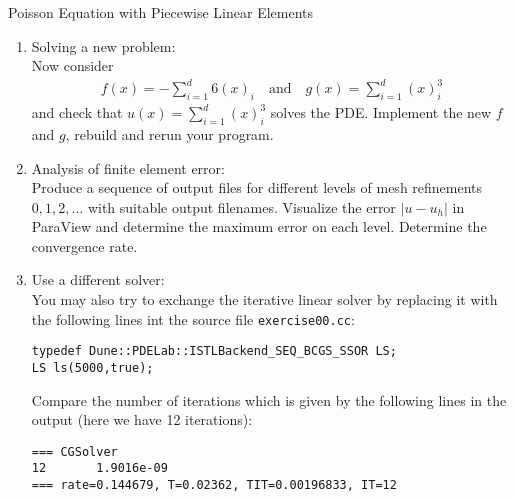\documentclass[12pt,a4paper]{article}
\begin{document}
\begin{Exercise}{Poisson Equation with Piecewise Linear Elements}
\begin{enumerate}
\item {\sc Solving a new problem}:\\
  Now consider
  \begin{align}
    f(x) =  -\sum_{i=1}^d 6(x)_i \quad\text{and}\quad  g(x) = \sum_{i=1}^d (x)_i^3
  \end{align}
  and check that $u(x)=\sum_{i=1}^d (x)_i^3$ solves the PDE. Implement
  the new $f$ and $g$, rebuild and rerun your program.

\item {\sc Analysis of finite element error}:\\
  Produce a sequence of output files for different levels of mesh
  refinements $0, 1, 2, \ldots$ with suitable output
  filenames. Visualize the error $|u-u_h|$ in Para\-View and determine
  the maximum error on each level.  Determine the convergence rate.

\item {\sc Use a different solver}:\\
  You may also try to exchange the iterative linear solver by
  replacing it with the following lines int the source file
  \lstinline{exercise00.cc}:
  \begin{lstlisting}
typedef Dune::PDELab::ISTLBackend_SEQ_BCGS_SSOR LS;
LS ls(5000,true);
  \end{lstlisting}
  Compare the number of iterations which is given by the following lines
  in the output (here we have 12 iterations):
  \begin{lstlisting}
=== CGSolver
12       1.9016e-09
=== rate=0.144679, T=0.02362, TIT=0.00196833, IT=12
  \end{lstlisting}
\end{enumerate}
\end{Exercise}
\end{document}
